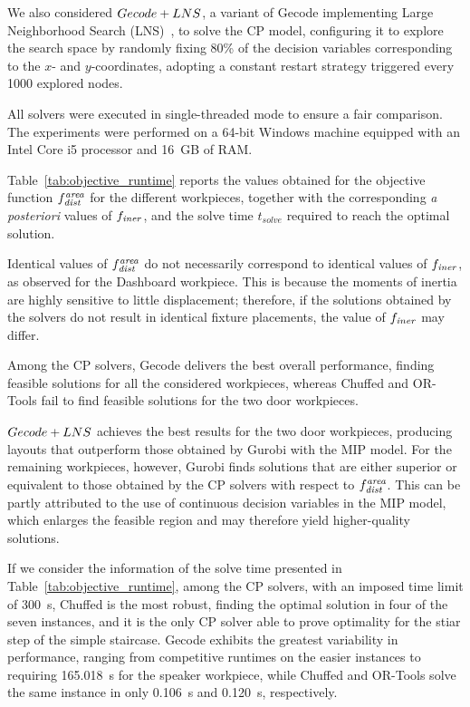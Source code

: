 We also considered $Gecode+LNS$, a variant of Gecode implementing Large Neighborhood Search (LNS)~\cite{pisinger2018large}, to solve the CP model, configuring it to explore the search space by randomly fixing 80\% of the decision variables corresponding to the $x$- and $y$-coordinates, adopting a constant restart strategy triggered every 1000 explored nodes.

All solvers were executed in single-threaded mode to ensure a fair comparison. The experiments were performed on a 64-bit Windows machine equipped with an Intel Core i5 processor and 16~GB of RAM.

Table~\ref{tab:objective_runtime} reports the values obtained for the objective function $f_{\mathit{dist}}^{\mathit{area}}$ for the different workpieces, together with the corresponding \emph{a posteriori} values of $f_\mathit{iner}$, and the solve time $t_{solve}$ required to reach the optimal solution. 

Identical values of $f_{\mathit{dist}}^{\mathit{area}}$ do not necessarily correspond to identical values of $f_\mathit{iner}$, as observed for the Dashboard workpiece. This is because the moments of inertia are highly sensitive to little displacement; therefore, if the solutions obtained by the solvers do not result in identical fixture placements, the value of $f_\mathit{iner}$ may differ. 

Among the CP solvers, Gecode delivers the best overall performance, finding feasible solutions for all the considered workpieces, whereas Chuffed and OR-Tools fail to find feasible solutions for the two door workpieces.

$Gecode+LNS$ achieves the best results for the two door workpieces, producing layouts that outperform those obtained by Gurobi with the MIP model. For the remaining workpieces, however, Gurobi finds solutions that are either superior or equivalent to those obtained by the CP solvers with respect to $f_{\mathit{dist}}^{\mathit{area}}$. This can be partly attributed to the use of continuous decision variables in the MIP model, which enlarges the feasible region and may therefore yield higher-quality solutions.

If we consider the information of the solve time presented in Table~\ref{tab:objective_runtime}, among the CP solvers, with an imposed time limit of 300~s, Chuffed is the most robust, finding the optimal solution in four of the seven instances, and it is the only CP solver able to prove optimality for the stiar step of the simple staircase. Gecode exhibits the greatest variability in performance, ranging from competitive runtimes on the easier instances to requiring 165.018~s for the speaker workpiece, while Chuffed and OR-Tools solve the same instance in only 0.106~s and 0.120~s, respectively.

